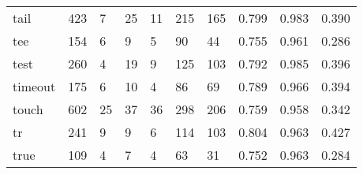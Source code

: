 \begin{longtable}{lp{1.3cm}p{1.3cm}p{1.3cm}p{1.3cm}p{1.3cm}p{1.3cm}p{1.3cm}p{1.3cm}p{1.3cm}}
tail      &                    423 &                                  7 &                                25 &                               11 &                               215 &                             165 &                                   0.799 &                                  0.983 &                                0.390 \\
tee       &                    154 &                                  6 &                                 9 &                                5 &                                90 &                              44 &                                   0.755 &                                  0.961 &                                0.286 \\
test      &                    260 &                                  4 &                                19 &                                9 &                               125 &                             103 &                                   0.792 &                                  0.985 &                                0.396 \\
timeout   &                    175 &                                  6 &                                10 &                                4 &                                86 &                              69 &                                   0.789 &                                  0.966 &                                0.394 \\
touch     &                    602 &                                 25 &                                37 &                               36 &                               298 &                             206 &                                   0.759 &                                  0.958 &                                0.342 \\
tr        &                    241 &                                  9 &                                 9 &                                6 &                               114 &                             103 &                                   0.804 &                                  0.963 &                                0.427 \\
true      &                    109 &                                  4 &                                 7 &                                4 &                                63 &                              31 &                                   0.752 &                                  0.963 &                                0.284 \\

\end{longtable}
